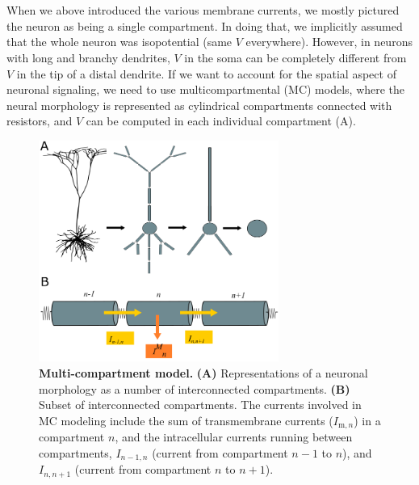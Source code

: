 \section{}
\label{sec:Neuron:morphology}
When we above introduced the various membrane currents, we mostly pictured the neuron as being a single compartment. In doing that, we implicitly assumed that the whole neuron was isopotential (same $V$ everywhere). 
However, in neurons with long and branchy dendrites, $V$ in the soma can be completely different from $V$ in the tip of a distal dendrite. If we want to account for the spatial aspect of neuronal signaling, we need to use multicompartmental (MC) models, where the neural morphology is represented as cylindrical compartments connected with resistors, and $V$ can be computed in each individual compartment (A). 

\begin{figure}[!ht]
\begin{center}
\includegraphics[width=0.7\textwidth]{Figures/Neuron/multikompis.png}
\end{center}
\caption{\textbf{Multi-compartment model.} {\bf (A)} Representations of a neuronal morphology as a number of interconnected compartments. {\bf (B)} Subset of interconnected compartments. The currents involved in MC modeling include the sum of transmembrane currents ($I_{\mathrm{m},n}$) in a compartment $n$, and the intracellular currents running between 
compartments, $I_{n-1,n}$ (current from compartment $n-1$ to $n$), and $I_{n,n+1}$ (current from compartment $n$ to $n+1$).
}
\label{fig:Neuron:multikompisen}
\end{figure}

